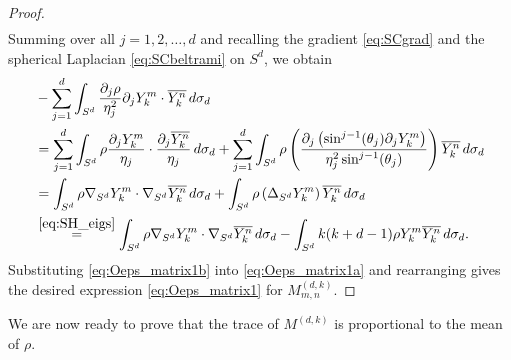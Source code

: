\documentclass[11pt]{amsart}
\theoremstyle{definition}
\theoremstyle{plain}
\theoremstyle{remark}
\newcommand{\del}{\partial}
\newcommand{\cc}{\overline}
\begin{document}
\begin{proof}
\begin{align*}
\end{align*} 
Summing over all $j = 1, 2, \dots, d$ and recalling the gradient \eqref{eq:SCgrad} and the spherical Laplacian \eqref{eq:SCbeltrami} on $S^d$, we obtain 
\begin{gather} \label{eq:Oeps_matrix1b} 
\begin{aligned} 
& -\sum_{j = 1}^d \int_{S^d} \frac{\del_j\rho}{\eta_j^2}\del_jY_k^m\cdot \cc{Y_k^n}\, d\sigma_d \\ 
& = \sum_{j = 1}^d \int_{S^d} \rho\frac{\del_jY_k^m}{\eta_j}\cdot \frac{\del_j\cc{Y_k^n}}{\eta_j}\, d\sigma_d + \sum_{j = 1}^d \int_{S^d} \rho \left(\frac{\del_j\left(\sin^{j - 1}(\theta_j)\del_jY_k^m\right)}{\eta_j^2\sin^{j - 1}(\theta_j)}\right) \cc{Y_k^n}\, d\sigma_d \\ 
& = \int_{S^d} \rho\nabla_{S^d}Y_k^m\cdot \nabla_{S^d}\cc{Y_k^n}\, d\sigma_d + \int_{S^d} \rho\left(\Delta_{S^d}Y_k^m\right)\cc{Y_k^n}\, d\sigma_d \\ 
& \stackrel{\eqref{eq:SH_eigs}}{=} \int_{S^d} \rho\nabla_{S^d}Y_k^m\cdot \nabla_{S^d}\cc{Y_k^n}\, d\sigma_d - \int_{S^d} k(k + d - 1)\rho Y_k^m\cc{Y_k^n}\, d\sigma_d. 
\end{aligned} 
\end{gather} 
Substituting \eqref{eq:Oeps_matrix1b} into \eqref{eq:Oeps_matrix1a} and rearranging gives the desired expression \eqref{eq:Oeps_matrix1} for $M_{m, n}^{(d, k)}$. 
\end{proof} 


We are now ready to prove that the trace of $M^{(d, k)}$ is proportional to the mean of $\rho$. 
\end{document}
